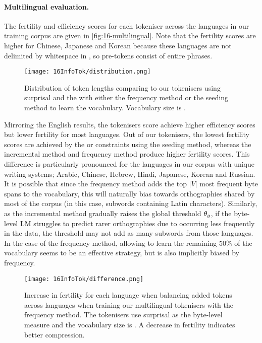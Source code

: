 \paragraph{Multilingual evaluation.}

The fertility and \renyi efficiency scores for each tokeniser across the  languages in our training corpus are given in \cref{fig:16-multilingual}. Note that the fertility scores are higher for Chinese, Japanese and Korean because these languages are not delimited by whitespace in \commoncorpus, so pre-tokens consist of entire phrases. 

\begin{figure}[!t]
    \centering
    \texttt{[image: 16InfoTok/distribution.png]}
    \caption{Distribution of token lengths comparing \bpewp to our \tokname tokenisers using surprisal and the  with either the frequency method or the seeding method to learn the vocabulary. Vocabulary size is .}
    \label{fig:16-distribution}
\end{figure}

Mirroring the English results, the \tokname tokenisers score achieve higher \renyi efficiency scores but lower fertility for most languages. Out of our tokenisers, the lowest fertility scores are achieved by the  or  constraints using the seeding method, whereas the incremental method and frequency method produce higher fertility scores. This difference is particularly pronounced for the languages in our corpus with unique writing systems; Arabic, Chinese, Hebrew, Hindi, Japanese, Korean and Russian. It is possible that since the frequency method adds the top $|V|$ most frequent byte spans to the vocabulary, this will naturally bias towards orthographies shared by most of the corpus (in this case, subwords containing Latin characters). Similarly, as the incremental method gradually raises the global threshold $\theta_g$, if the byte-level LM struggles to predict rarer orthographies due to occurring less frequently in the data, the threshold may not add as many subwords from those languages. In the case of the frequency method, allowing \bpe to learn the remaining $50\%$ of the vocabulary seems to be an effective strategy, but \bpe is also implicitly biased by frequency.

\begin{figure}[!t]
    \centering
    \texttt{[image: 16InfoTok/difference.png]}
    \caption{Increase in fertility for each language when balancing added tokens across languages when training our multilingual \tokname tokenisers with the frequency method. The tokenisers use surprisal as the byte-level measure and the vocabulary size is . A decrease in fertility indicates better compression.}
    \label{fig:16-difference}
\end{figure}

